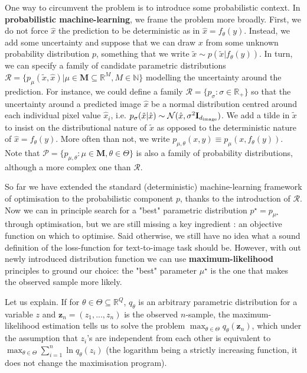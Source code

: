 \documentclass{article}
\begin{document}
\begin{appendix}
One way to circumvent the problem is to introduce some probabilistic context. In \textbf{probabilistic machine-learning}, we frame the problem more broadly. First, we do not force $\hat x$ the prediction to be deterministic as in $\hat x=f_\theta(y)$. Instead, we add some uncertainty and suppose that we can draw $x$ from some unknown probability distribution $p$, something that we write $\tilde x \sim p(\tilde x|f_\theta(y))$. In turn, we can specify a family of candidate parametric distributions $\mathcal{R}=\{p_\mu(\tilde x, \hat x)|\mu \in \mathbf{M}\subseteq \mathbb{R}^M, M\in\mathbb{N}\}$ modelling the uncertainty around the prediction. For instance, we could define a family $\mathcal{R}=\{p_\sigma:\sigma \in \mathbb{R}_+\}$ so that the uncertainty around a predicted image $\hat x$ be a normal distribution centred around each individual pixel value $\hat x_i$, i.e. $p_{\sigma}(\tilde x | \hat x)\sim 
\mathcal{N}(\hat x, \sigma^2 \mathbf{I}_{d_{\mathrm{image}}})$. We add a tilde in $\tilde x$ to insist on the distributional nature of $\tilde x$ as opposed to the deterministic nature of $\hat x=f_\theta(y)$. More often than not, we write $p_{\mu,\theta}(x,y)\equiv p_\mu(x, f_\theta(y))$. Note that $\mathcal{P}=\{p_{\mu,\theta}:\mu \in\mathbf{M},\theta\in\Theta\}$ is also a family of probability distributions, although a more complex one than $\mathcal{R}$.

So far we have extended the standard (deterministic) machine-learning framework of optimisation to the probabilistic component $p$, thanks to the introduction of $\mathcal{R}$. Now we can in principle search for a "best" parametric distribution $p^\star=p_{\mu^\star}$ through optimisation, but we are still missing a key ingredient : an objective function on which to optimise. Said otherwise, we still have no idea what a sound definition of the loss-function for text-to-image task should be. However, with out newly introduced distribution function we can use \textbf{maximum-likelihood} principles to ground our choice: the "best" parameter $\mu^\star$ is the one that makes the observed sample more likely.

Let us explain. If for $\theta \in \Theta \subseteq \mathbb{R}^Q$, $q_\theta$ is an arbitrary parametric distribution for a variable $z$ and $\mathbf{z}_n=(z_1, ..., z_n)$ is the observed $n$-sample, the maximum-likelihood estimation tells us to solve the problem $\max_{\theta \in \Theta} q_\theta(\mathbf{z}_n)$, which under the assumption that $z_i$'s are independent from each other is equivalent to $\max_{\theta \in \Theta} \sum_{i=1}^n \ln q_\theta(z_i)$ (the logarithm being a strictly increasing function, it does not change the maximisation program).


\end{appendix}
\end{document}
